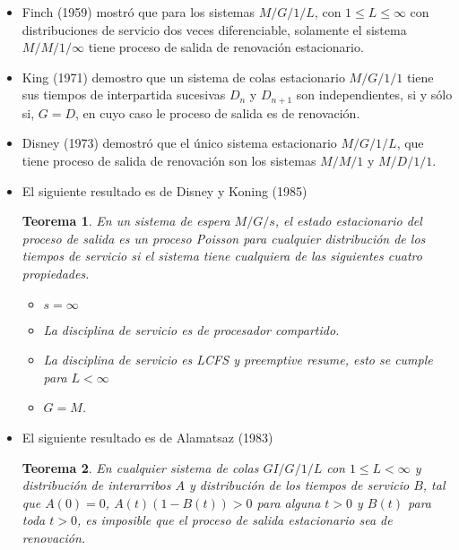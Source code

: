 \documentclass{article}
\newtheorem{Teo}{Teorema}
\begin{document}
\begin{itemize}
\item Finch (1959) mostr\'o que para los sistemas $M/G/1/L$, con $1\leq L\leq \infty$ con distribuciones de servicio dos veces diferenciable, solamente el sistema $M/M/1/\infty$ tiene proceso de salida de renovaci\'on estacionario.

\item King (1971) demostro que un sistema de colas estacionario $M/G/1/1$ tiene sus tiempos de interpartida sucesivas $D_{n}$ y $D_{n+1}$ son independientes, si y s\'olo si, $G=D$, en cuyo caso le proceso de salida es de renovaci\'on.

\item Disney (1973) demostr\'o que el \'unico sistema estacionario $M/G/1/L$, que tiene proceso de salida de renovaci\'on  son los sistemas $M/M/1$ y $M/D/1/1$.



\item El siguiente resultado es de Disney y Koning (1985)
\begin{Teo}
En un sistema de espera $M/G/s$, el estado estacionario del proceso de salida es un proceso Poisson para cualquier distribuci\'on de los tiempos de servicio si el sistema tiene cualquiera de las siguientes cuatro propiedades.

\begin{itemize}
\item[a)] $s=\infty$
\item[b)] La disciplina de servicio es de procesador compartido.
\item[c)] La disciplina de servicio es LCFS y preemptive resume, esto se cumple para $L<\infty$
\item[d)] $G=M$.
\end{itemize}

\end{Teo}

\item El siguiente resultado es de Alamatsaz (1983)

\begin{Teo}
En cualquier sistema de colas $GI/G/1/L$ con $1\leq L<\infty$ y distribuci\'on de interarribos $A$ y distribuci\'on de los tiempos de servicio $B$, tal que $A\left(0\right)=0$, $A\left(t\right)\left(1-B\left(t\right)\right)>0$ para alguna $t>0$ y $B\left(t\right)$ para toda $t>0$, es imposible que el proceso de salida estacionario sea de renovaci\'on.
\end{Teo}

\end{itemize}
\end{document}
